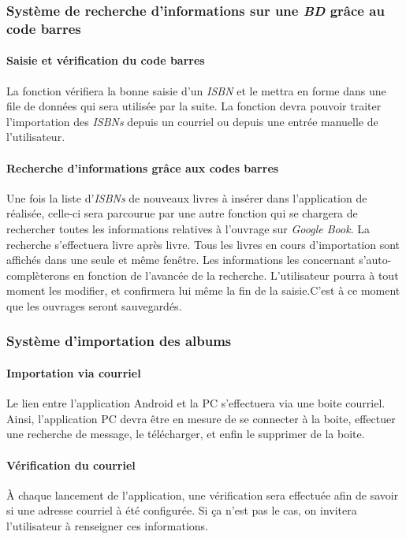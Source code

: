 \subsubsection{Système de recherche d'informations sur une \emph{BD} grâce au code barres}

\paragraph{Saisie et vérification du code barres}
La fonction vérifiera la bonne saisie d'un \emph{ISBN} et le mettra en forme dans une file de données qui sera utilisée par la suite. 
La fonction devra pouvoir traiter l'importation des \emph{ISBNs} depuis un courriel ou depuis une entrée manuelle de l'utilisateur. 

\paragraph{Recherche d'informations grâce aux codes barres}
Une fois la liste d'\emph{ISBNs} de nouveaux livres à insérer dans l'application de réalisée, 
	 celle-ci sera parcourue par une autre fonction qui se chargera de rechercher toutes les informations relatives à l'ouvrage sur \emph{Google Book}. 
La recherche s'effectuera livre après livre. 
Tous les livres en cours d'importation sont affichés dans une seule et même fenêtre. 
Les informations les concernant s'auto-complèterons en fonction de l'avancée de la recherche.
L'utilisateur pourra à tout moment les modifier, et confirmera lui même la fin de la saisie.C'est à ce moment que les ouvrages seront sauvegardés.

\subsubsection{Système d'importation des albums}

\paragraph{Importation via courriel} 
Le lien entre l'application Android et la PC s'effectuera via une boite courriel. 
Ainsi, l'application PC devra être en mesure de se connecter à la boite, effectuer une recherche de message, 
	le télécharger, et enfin le supprimer de la boite. 

\paragraph{Vérification du courriel}
À chaque lancement de l'application, une vérification sera effectuée afin de savoir si une adresse courriel à été configurée. 
Si ça n'est pas le cas, on invitera l'utilisateur à renseigner ces informations. 

